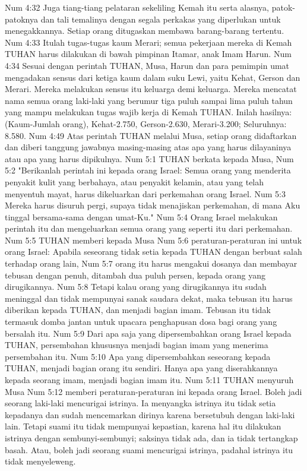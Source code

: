 Num 4:32  Juga tiang-tiang pelataran sekeliling Kemah itu serta alasnya, patok-patoknya dan tali temalinya dengan segala perkakas yang diperlukan untuk menegakkannya. Setiap orang ditugaskan membawa barang-barang tertentu.
Num 4:33  Itulah tugas-tugas kaum Merari; semua pekerjaan mereka di Kemah TUHAN harus dilakukan di bawah pimpinan Itamar, anak Imam Harun.
Num 4:34  Sesuai dengan perintah TUHAN, Musa, Harun dan para pemimpin umat mengadakan sensus dari ketiga kaum dalam suku Lewi, yaitu Kehat, Gerson dan Merari. Mereka melakukan sensus itu keluarga demi keluarga. Mereka mencatat nama semua orang laki-laki yang berumur tiga puluh sampai lima puluh tahun yang mampu melakukan tugas wajib kerja di Kemah TUHAN. Inilah hasilnya: (Kaum-Jumlah orang), Kehat-2.750, Gerson-2.630, Merari-3.200; Seluruhnya: 8.580.
Num 4:49  Atas perintah TUHAN melalui Musa, setiap orang didaftarkan dan diberi tanggung jawabnya masing-masing atas apa yang harus dilayaninya atau apa yang harus dipikulnya.
Num 5:1  TUHAN berkata kepada Musa,
Num 5:2  "Berikanlah perintah ini kepada orang Israel: Semua orang yang menderita penyakit kulit yang berbahaya, atau penyakit kelamin, atau yang telah menyentuh mayat, harus dikeluarkan dari perkemahan orang Israel.
Num 5:3  Mereka harus disuruh pergi, supaya tidak menajiskan perkemahan, di mana Aku tinggal bersama-sama dengan umat-Ku."
Num 5:4  Orang Israel melakukan perintah itu dan mengeluarkan semua orang yang seperti itu dari perkemahan.
Num 5:5  TUHAN memberi kepada Musa
Num 5:6  peraturan-peraturan ini untuk orang Israel: Apabila seseorang tidak setia kepada TUHAN dengan berbuat salah terhadap orang lain,
Num 5:7  orang itu harus mengakui dosanya dan membayar tebusan dengan penuh, ditambah dua puluh persen, kepada orang yang dirugikannya.
Num 5:8  Tetapi kalau orang yang dirugikannya itu sudah meninggal dan tidak mempunyai sanak saudara dekat, maka tebusan itu harus diberikan kepada TUHAN, dan menjadi bagian imam. Tebusan itu tidak termasuk domba jantan untuk upacara penghapusan dosa bagi orang yang bersalah itu.
Num 5:9  Dari apa saja yang dipersembahkan orang Israel kepada TUHAN, persembahan khususnya menjadi bagian imam yang menerima persembahan itu.
Num 5:10  Apa yang dipersembahkan seseorang kepada TUHAN, menjadi bagian orang itu sendiri. Hanya apa yang diserahkannya kepada seorang imam, menjadi bagian imam itu.
Num 5:11  TUHAN menyuruh Musa
Num 5:12  memberi peraturan-peraturan ini kepada orang Israel. Boleh jadi seorang laki-laki mencurigai istrinya. Ia menyangka istrinya itu tidak setia kepadanya dan sudah mencemarkan dirinya karena bersetubuh dengan laki-laki lain. Tetapi suami itu tidak mempunyai kepastian, karena hal itu dilakukan istrinya dengan sembunyi-sembunyi; saksinya tidak ada, dan ia tidak tertangkap basah. Atau, boleh jadi seorang suami mencurigai istrinya, padahal istrinya itu tidak menyeleweng.

